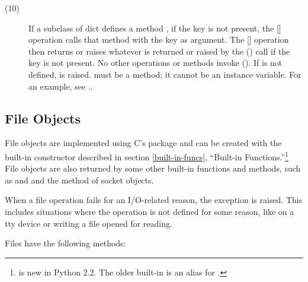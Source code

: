 \begin{description}
\item[(10)] If a subclass of dict defines a method ,
if the key  is not present, the [] operation calls
that method with the key  as argument.  The []
operation then returns or raises whatever is returned or raised by the
() call if the key is not present.
No other operations or methods invoke ().
If  is not defined,  is raised.
 must be a method; it cannot be an instance variable.
For an example, see ..

\end{description}

\subsection{File Objects
            \label{bltin-file-objects}}

File objects are implemented using C's 
package and can be created with the built-in constructor
 described in section
\ref{built-in-funcs}, ``Built-in Functions.''\footnote{
is new in Python 2.2.  The older built-in  is an
alias for .}  File objects are also returned
by some other built-in functions and methods, such as
 and  and the
 method of socket objects.

When a file operation fails for an I/O-related reason, the exception
 is raised.  This includes situations where the
operation is not defined for some reason, like  on a tty
device or writing a file opened for reading.

Files have the following methods:


